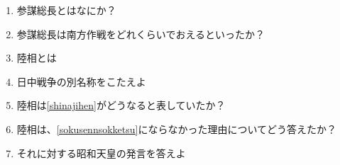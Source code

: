 \documentclass[]{jsarticle}
\begin{document}
\begin{enumerate}
	\item 参謀総長とはなにか？
	\item 参謀総長は南方作戦をどれくらいでおえるといったか？
	\item 陸相とは
	\item 日中戦争の別名称をこたえよ\label{shinajihen}
	\item 陸相は\ref{shinajihen}がどうなると表していたか？\label{sokusennsokketsu}
	\item 陸相は、\ref{sokusennsokketsu}にならなかった理由についてどう答えたか？
	\item それに対する昭和天皇の発言を答えよ
\end{enumerate}

\begin{comment}
\begin{figure}[htbp]
	\begin{center}
		\texttt{[image: ./src/RC\_series\_circuit\_c.png]}
		\caption{RC直列回路 ($V_C$の測定)}
		\label{fig:RC_series_circuit_c}
	\end{center}
\end{figure}
\begin{equation}
	\label{Relationship_between_impedance_Z}
	V = ZI [\si{\volt}], I = \frac{V}{Z} [\si{\ampere}], Z = \frac{V}{I}[\si{\ohm}]
\end{equation}
\begin{table}[h]
	\caption{計測および実験補助器具}
	\label{tab:fixtures}
	\centering
	\begin{tabular}{|c|c|c|c|}
		\hline
		器具名 & 製造元 & 計器番号 & 定格 \\
	\end{tabular}
\end{table}
\end{comment}
\end{document}
